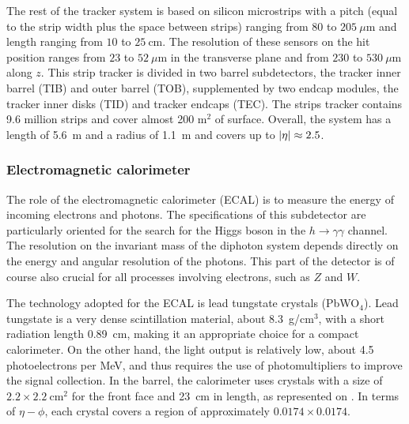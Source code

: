         The rest of the tracker system is based on silicon microstrips with a pitch (equal
        to the strip width plus the space between strips) ranging
        from $80$ to $205~\mu\text{m}$ and length ranging from $10$ to $25~\text{cm}$.
        The resolution of these sensors on the hit position ranges from $23$ to $52~\mu\text{m}$
        in the transverse plane and from $230$ to $530~\mu\text{m}$ along $z$.
        This strip tracker is divided in two barrel subdetectors, the tracker inner barrel
        (TIB) and outer barrel (TOB), supplemented by two endcap modules, the tracker inner
        disks (TID) and tracker endcaps (TEC). The strips tracker contains 9.6 million strips
        and cover almost 200 m$^2$ of surface. Overall, the system has a length of 5.6~m
        and a radius of 1.1~m and covers up to $\left| \eta \right| \approx 2.5$.

            \subsubsection{Electromagnetic calorimeter}

        The role of the electromagnetic calorimeter (ECAL) is to measure the energy of incoming electrons
        and photons. The specifications of this subdetector are particularly oriented for
        the search for the Higgs boson in the $h \rightarrow \gamma \gamma$ channel. The resolution on the
        invariant mass of the diphoton system depends directly on the energy and angular
        resolution of the photons. This part of the detector is of course also crucial for
        all processes involving electrons, such as $Z$ and $W$.

        The technology adopted for the ECAL is lead tungstate crystals (PbWO$_4$). Lead
        tungstate is a very dense scintillation material, about 8.3~g/cm$^3$, with a short
        radiation length 0.89~cm, making it an appropriate choice for a compact calorimeter.
        On the other hand, the light output is relatively low, about 4.5 photoelectrons
        per MeV, and thus requires the use of photomultipliers to improve the signal collection.
        In the barrel, the calorimeter uses crystals with a size of $2.2\times2.2~\text{cm}^2$
        for the front face and 23~cm in length, as represented on .
        In terms of $\eta-\phi$, each crystal covers a region of approximately $0.0174
        \times 0.0174$.


